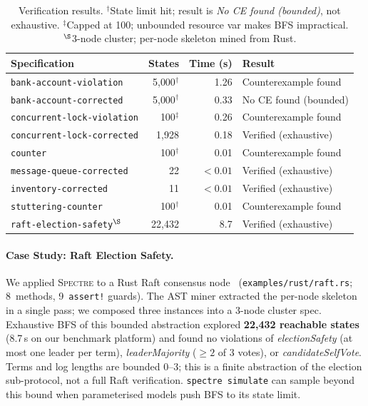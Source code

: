 \documentclass[runningheads]{llncs}
\begin{document}
\begin{table}[t]
\caption{Verification results.  $^\dagger$State limit hit; result is
  \emph{No CE found (bounded)}, not exhaustive.
  $^\ddagger$Capped at 100; unbounded resource var makes BFS impractical.
  $^\S$3-node cluster; per-node skeleton mined from Rust.}\label{tab:verif}
\centering
\begin{tabular}{lrrl}
\toprule
Specification              & States & Time (s) & Result \\
\midrule
\texttt{bank-account-violation}    & 5{,}000$^\dagger$ & 1.26 & Counterexample found \\
\texttt{bank-account-corrected}    & 5{,}000$^\dagger$ & 0.33 & No CE found (bounded) \\
\texttt{concurrent-lock-violation} & 100$^\ddagger$    & 0.26 & Counterexample found \\
\texttt{concurrent-lock-corrected} & 1{,}928 & 0.18 & Verified (exhaustive) \\
\texttt{counter}                   &    100$^\dagger$ & 0.01 & Counterexample found \\
\texttt{message-queue-corrected}   &     22 & ${<}0.01$ & Verified (exhaustive) \\
\texttt{inventory-corrected}       &     11 & ${<}0.01$ & Verified (exhaustive) \\
\texttt{stuttering-counter}        &    100$^\dagger$ & 0.01 & Counterexample found \\
\midrule
\texttt{raft-election-safety}$^\S$ & 22{,}432 & 8.7  & Verified (exhaustive) \\
\bottomrule
\end{tabular}
\end{table}

\paragraph{Case Study: Raft Election Safety.}
We applied \textsc{Spectre} to a Rust Raft consensus node~\cite{ongaro2014raft}
(\texttt{examples/rust/raft.rs}; 8~methods, 9~\texttt{assert!} guards).
The AST miner extracted the per-node skeleton in a single pass;
we composed three instances into a 3-node cluster spec.
Exhaustive BFS of this bounded abstraction explored
\textbf{22{,}432 reachable states} (8.7\,s on our benchmark platform) and found no violations of
\emph{electionSafety} (at most one leader per term),
\emph{leaderMajority} ($\ge 2$ of 3 votes), or \emph{candidateSelfVote}.
Terms and log lengths are bounded 0--3; this is a finite abstraction of
the election sub-protocol, not a full Raft verification.
\texttt{spectre simulate} can sample beyond this bound when parameterised
models push BFS to its state limit.
\end{document}
